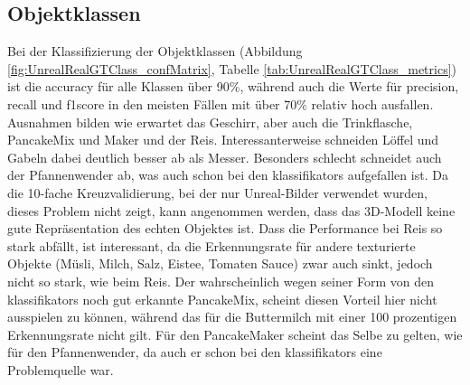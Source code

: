 \subsection{Objektklassen}

Bei der Klassifizierung der Objektklassen (Abbildung \ref{fig:UnrealRealGTClass_confMatrix}, Tabelle \ref{tab:UnrealRealGTClass_metrics}) ist die \gls{accuracy} für alle Klassen über 90\%, während auch die Werte für \gls{precision}, \gls{recall} und \gls{f1score} in den meisten Fällen mit über 70\% relativ hoch ausfallen. Ausnahmen bilden wie erwartet das Geschirr, aber auch die Trinkflasche, PancakeMix und Maker und der Reis. Interessanterweise schneiden Löffel und Gabeln dabei deutlich besser ab als Messer. Besonders schlecht schneidet auch der Pfannenwender ab, was auch schon bei den \glspl{klassifikator} aufgefallen ist. Da die 10-fache Kreuzvalidierung, bei der nur Unreal-Bilder verwendet wurden, dieses Problem nicht zeigt, kann angenommen werden, dass das 3D-Modell keine gute Repräsentation des echten Objektes ist. Dass die Performance bei Reis so stark abfällt, ist interessant, da die Erkennungsrate für andere texturierte Objekte (Müsli, Milch, Salz, Eistee, Tomaten Sauce) zwar auch sinkt, jedoch nicht so stark, wie beim Reis. Der wahrscheinlich wegen seiner Form von den \glspl{klassifikator} noch gut erkannte PancakeMix, scheint diesen Vorteil hier nicht ausspielen zu können, während das für die Buttermilch mit einer 100 prozentigen Erkennungsrate nicht gilt. Für den PancakeMaker scheint das Selbe zu gelten, wie für den Pfannenwender, da auch er schon bei den \glspl{klassifikator} eine Problemquelle war. 

